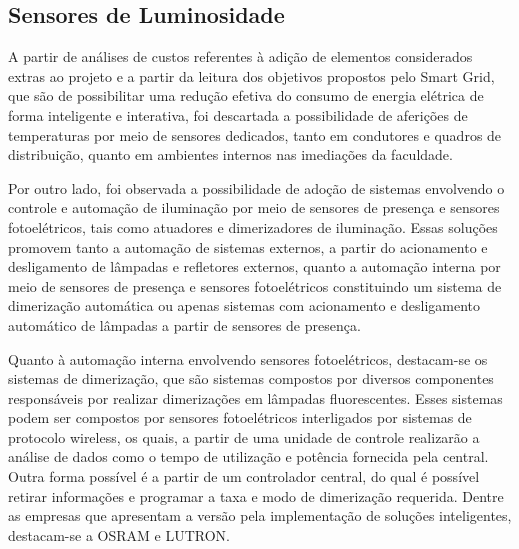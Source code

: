 \subsection{Sensores de Luminosidade}
A partir de análises de custos referentes à adição de elementos considerados extras ao projeto e a partir da leitura dos objetivos propostos pelo Smart Grid, que são de possibilitar uma redução efetiva do consumo de energia elétrica de forma inteligente e interativa, foi descartada a possibilidade de aferições de temperaturas por meio de sensores dedicados, tanto em condutores e quadros de distribuição, quanto em ambientes internos nas imediações da faculdade. 

Por outro lado, foi observada a possibilidade de adoção de sistemas envolvendo o controle e automação de iluminação por meio de sensores de presença e sensores fotoelétricos, tais como atuadores e dimerizadores de iluminação. Essas soluções promovem tanto a automação de sistemas externos, a partir do acionamento e desligamento de lâmpadas e refletores externos, quanto a automação interna por meio de sensores de presença e sensores fotoelétricos constituindo um sistema de dimerização automática ou apenas sistemas com acionamento e desligamento automático de lâmpadas a partir de sensores de presença.

Quanto à automação interna envolvendo sensores fotoelétricos, destacam-se os sistemas de dimerização, que são sistemas compostos por diversos componentes responsáveis por realizar dimerizações em lâmpadas fluorescentes. Esses sistemas podem ser compostos por sensores fotoelétricos interligados por sistemas de protocolo wireless, os quais, a partir de uma unidade de controle realizarão a análise de dados como o tempo de utilização e potência fornecida pela central. Outra forma possível é a partir de um controlador central, do qual é possível retirar informações e programar a taxa e modo de dimerização requerida. Dentre as empresas que apresentam a versão pela implementação de soluções inteligentes, destacam-se a OSRAM e LUTRON. 


